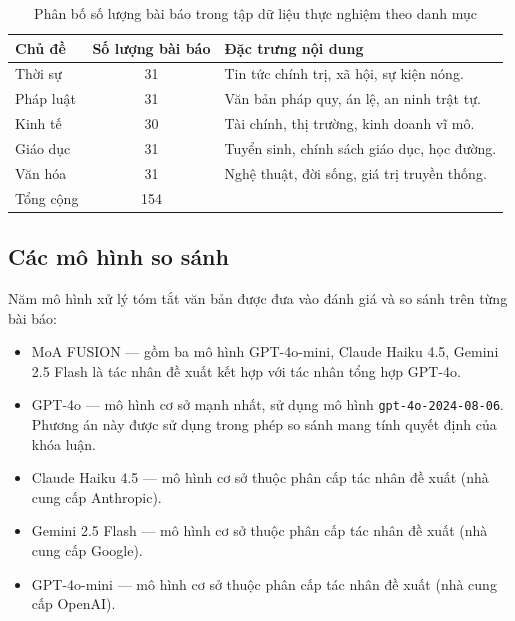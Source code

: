 \begin{table}[htbp]
\centering
\caption{Phân bố số lượng bài báo trong tập dữ liệu thực nghiệm theo danh mục}
\label{tab:dataset_distribution}
\begin{tabularx}{\textwidth}{l c X}
\hline
Chủ đề & Số lượng bài báo & Đặc trưng nội dung \\ \hline
Thời sự         & 31                        & Tin tức chính trị, xã hội, sự kiện nóng. \\
Pháp luật       & 31                        & Văn bản pháp quy, án lệ, an ninh trật tự. \\
Kinh tế         & 30                        & Tài chính, thị trường, kinh doanh vĩ mô. \\
Giáo dục        & 31                        & Tuyển sinh, chính sách giáo dục, học đường. \\
Văn hóa         & 31                        & Nghệ thuật, đời sống, giá trị truyền thống. \\ \hline
Tổng cộng & 154        &  \\ \hline
\end{tabularx}
\end{table}

\subsection{Các mô hình so sánh}

Năm mô hình xử lý tóm tắt văn bản được đưa vào đánh giá và so sánh trên từng bài báo:

\begin{itemize}
  \item MoA FUSION --- gồm ba mô hình GPT-4o-mini, Claude Haiku 4.5, Gemini 2.5 Flash là tác nhân đề xuất kết hợp với tác nhân tổng hợp GPT-4o. 
  \item GPT-4o --- mô hình cơ sở mạnh nhất, sử dụng mô hình \texttt{gpt-4o-2024-08-06}. Phương án này được sử dụng trong phép so sánh mang tính quyết định của khóa luận.
  \item Claude Haiku 4.5 --- mô hình cơ sở thuộc phân cấp tác nhân đề xuất (nhà cung cấp Anthropic).
  \item Gemini 2.5 Flash --- mô hình cơ sở thuộc phân cấp tác nhân đề xuất (nhà cung cấp Google).
  \item GPT-4o-mini --- mô hình cơ sở thuộc phân cấp tác nhân đề xuất (nhà cung cấp OpenAI).
\end{itemize}

